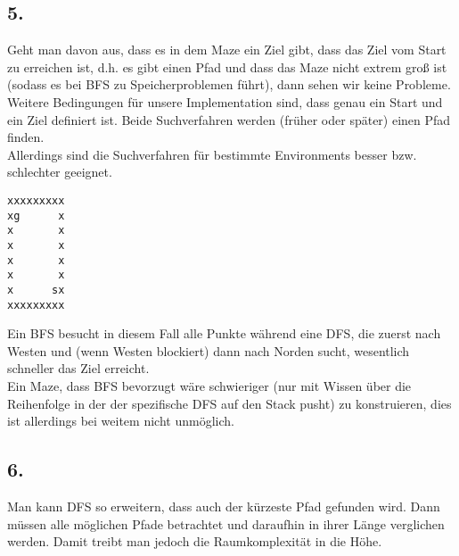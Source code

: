 \documentclass[a4paper,11pt,fleqn]{scrartcl}
\begin{document}
\subsection*{5.}
Geht man davon aus, dass es in dem Maze ein Ziel gibt, dass das Ziel vom Start zu erreichen ist, d.h. es gibt einen Pfad und dass das Maze nicht extrem groß ist (sodass es bei BFS zu Speicherproblemen führt), dann sehen wir keine Probleme.
Weitere Bedingungen für unsere Implementation sind, dass genau ein Start und ein Ziel definiert ist.
Beide Suchverfahren werden (früher oder später) einen Pfad finden.\\
Allerdings sind die Suchverfahren für bestimmte Environments besser bzw. schlechter geeignet.

\begin{verbatim}
xxxxxxxxx
xg      x
x       x
x       x
x       x
x       x
x      sx
xxxxxxxxx
\end{verbatim}
\newpage
Ein BFS besucht in diesem Fall alle Punkte während eine DFS, die zuerst nach Westen und (wenn Westen blockiert) dann nach Norden sucht, wesentlich schneller das Ziel erreicht. \\
Ein Maze, dass BFS bevorzugt wäre schwieriger (nur mit Wissen über die Reihenfolge in der der spezifische DFS auf den Stack pusht) zu konstruieren, dies ist allerdings bei weitem nicht unmöglich.
\subsection*{6.}
Man kann DFS so erweitern, dass auch der kürzeste Pfad gefunden wird. Dann müssen alle möglichen Pfade betrachtet und daraufhin in ihrer Länge verglichen werden. Damit treibt man jedoch die Raumkomplexität in die Höhe.
\end{document}
